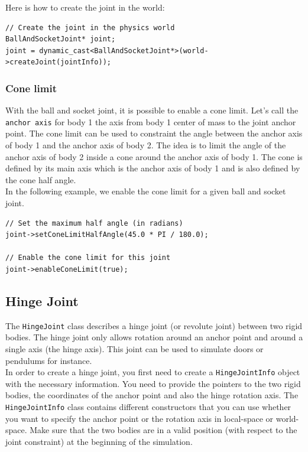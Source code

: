 \documentclass[a4paper,12pt]{article}
\begin{document}
    Here is how to create the joint in the world: \\

    \begin{lstlisting}
// Create the joint in the physics world
BallAndSocketJoint* joint;
joint = dynamic_cast<BallAndSocketJoint*>(world->createJoint(jointInfo));
  \end{lstlisting}

    \subsubsection{Cone limit}

    With the ball and socket joint, it is possible to enable a cone limit. Let's call the \texttt{anchor axis} for body 1 the axis from body 1 center of mass
    to the joint anchor point. The cone limit can be used to constraint the angle between the anchor axis of body 1 and the anchor axis of body 2.
    The idea is to limit the angle of the anchor axis of body 2 inside a cone around the anchor axis of body 1. The cone is defined by its main axis
    which is the anchor axis of body 1 and is also defined by the cone half angle. \\

    In the following example, we enable the cone limit for a given ball and socket joint. \\

    \begin{lstlisting}
// Set the maximum half angle (in radians) 
joint->setConeLimitHalfAngle(45.0 * PI / 180.0);

// Enable the cone limit for this joint
joint->enableConeLimit(true);
  \end{lstlisting}

    \subsection{Hinge Joint}

    The \texttt{HingeJoint} class describes a hinge joint (or revolute joint) between two rigid bodies. The hinge joint only allows rotation around an
    anchor point and around a single axis (the hinge axis). This joint can be used to simulate doors or pendulums for instance. \\

    In order to create a hinge joint, you first need to create a \texttt{HingeJointInfo} object with the necessary information. You need to provide
    the pointers to the two rigid bodies, the coordinates of the anchor point and also the hinge rotation axis. The \texttt{HingeJointInfo} class contains
    different constructors that you can use whether you want to specify the anchor point or the rotation axis in local-space or world-space.
    Make sure that the two bodies are in a valid position (with respect to the joint constraint) at the beginning of the simulation. \\
\end{document}
